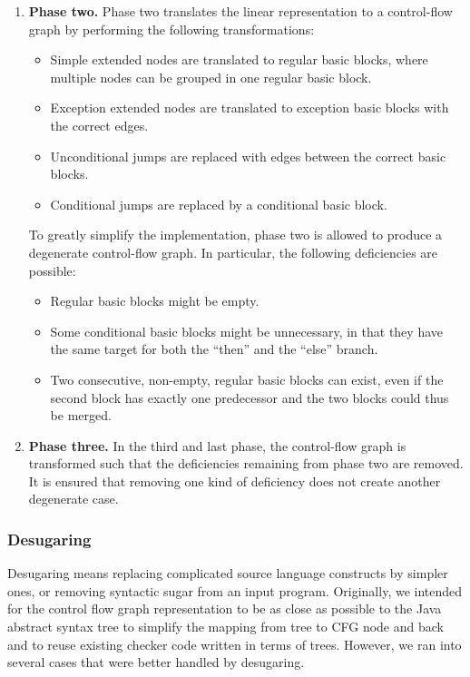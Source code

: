 \begin{enumerate}
    \item \textbf{Phase two.} Phase two translates the linear
      representation to a control-flow graph by performing the
      following transformations:
    \begin{itemize}
        \item Simple extended nodes are translated to regular basic
          blocks, where multiple nodes can be grouped in one regular
          basic block.
        \item Exception extended nodes are translated to exception
          basic blocks with the correct edges.
        \item Unconditional jumps are replaced with edges between the
          correct basic blocks.
        \item Conditional jumps are replaced by a conditional basic
          block.
    \end{itemize}
    To greatly simplify the implementation, phase two is allowed to
    produce a degenerate control-flow graph. In particular, the
    following deficiencies are possible:
    \begin{itemize}
    \item Regular basic blocks might be empty.
    \item Some conditional basic blocks might be unnecessary, in that
      they have the same target for both the ``then'' and the
      ``else'' branch.
    \item Two consecutive, non-empty, regular basic blocks can exist,
      even if the second block has exactly one predecessor and
      the two blocks could thus be merged.
    \end{itemize}
    \item \textbf{Phase three.} In the third and last phase, the
      control-flow graph is transformed such that the deficiencies
      remaining from phase two are removed. It is ensured that
      removing one kind of deficiency does not create another
      degenerate case.
\end{enumerate}



\subsubsection{Desugaring}
\label{sec:desugaring}

Desugaring means replacing complicated source language constructs by
simpler ones, or removing syntactic sugar from an input program.
Originally, we intended for the control flow graph representation to
be as close as possible to the Java abstract syntax tree to simplify
the mapping from tree to CFG node and back and to reuse existing
checker code written in terms of trees.  However, we ran into several
cases that were better handled by desugaring.

